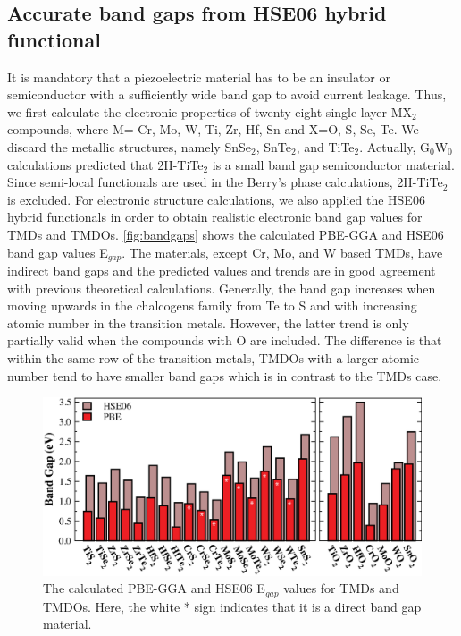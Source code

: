 \subsection{Accurate band gaps from HSE06 hybrid functional}

It is mandatory that a piezoelectric material has to be an insulator or semiconductor with a sufficiently wide band gap to avoid current leakage. Thus, we first calculate the electronic properties of twenty eight single layer MX$_2$ compounds, where M= Cr,  Mo, W, Ti, Zr, Hf, Sn and X=O, S, Se, Te. We discard the metallic structures, namely SnSe$_2$, SnTe$_2$, and TiTe$_2$. Actually, G$_0$W$_0$ calculations predicted that 2H-TiTe$_2$ is a small band gap semiconductor material\cite{Rasmussen2015}. Since semi-local functionals are used in the Berry's phase calculations, 2H-TiTe$_2$ is excluded. For electronic structure calculations, we also applied the HSE06 hybrid functionals in order to obtain realistic electronic band gap values for TMDs and TMDOs. \autoref{fig:bandgaps} shows the calculated PBE-GGA and HSE06 band gap values E$_{gap}$. The materials, except Cr, Mo, and W based TMDs, have indirect band gaps and the predicted values and trends are in good agreement with previous theoretical calculations\cite{Duerloo2012,Ataca2012,Guo2014a}. Generally, the band gap increases when moving upwards in the chalcogens family from Te to S and with increasing atomic number in the transition metals. However, the latter trend is only partially valid when the compounds with O are included. The difference is that within the same row of the transition metals, TMDOs with a larger atomic number tend to have smaller band gaps which is in contrast to the TMDs case.

\begin{figure}[htbp]
\centering
\includegraphics[width=0.8\linewidth]{bandgaps.eps}
\caption{\label{fig:bandgaps}The calculated PBE-GGA and HSE06 E$_{gap}$ values for TMDs and TMDOs. Here, the white * sign indicates that it is a direct band gap material.}
\end{figure}

